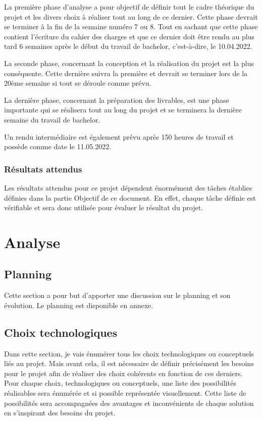 \documentclass[
    iai, %
    il, %
]{heig-tb}
\begin{document}
La première phase d'analyse a pour objectif de définir tout le cadre théorique du projet et les divers choix à réaliser tout au long de ce dernier.
Cette phase devrait se terminer à la fin de la semaine numéro 7 ou 8.
Tout en sachant que cette phase contient l'écriture du cahier des charges et que ce dernier doit être rendu au plus tard 6 semaines après le début du travail de bachelor, c'est-à-dire, le 10.04.2022.

La seconde phase, concernant la conception et la réalisation du projet est la plus conséquente.
Cette dernière suivra la première et devrait se terminer lors de la 20ème semaine si tout se déroule comme prévu.

La dernière phase, concernant la préparation des livrables, est une phase importante qui se réalisera tout au long du projet et se terminera la dernière semaine du travail de bachelor.

Un rendu intermédiaire est également prévu après 150 heures de travail et possède comme date le 11.05.2022.

\subsection{Résultats attendus}

Les résultats attendus pour ce projet dépendent énormément des tâches établies définies dans la partie Objectif de ce document.
En effet, chaque tâche définie est vérifiable et sera donc utilisée pour évaluer le résultat du projet.
\newpage

\chapter{Analyse}

\section{Planning}
Cette section a pour but d'apporter une discussion sur le planning et son évolution.
Le planning est disponible en annexe.

\section{Choix technologiques}

Dans cette section, je vais énumérer tous les choix technologiques ou conceptuels liés au projet.
Mais avant cela, il est nécessaire de définir précisément les besoins pour le projet afin de réaliser des choix cohérents en fonction de ces derniers.
Pour chaque choix, technologiques ou conceptuels, une liste des possibilités réalisables sera énumérée et si possible représentée visuellement.
Cette liste de possibilités sera accompagnées des avantages et inconvénients de chaque solution en s'inspirant des besoins du projet.
\end{document}
